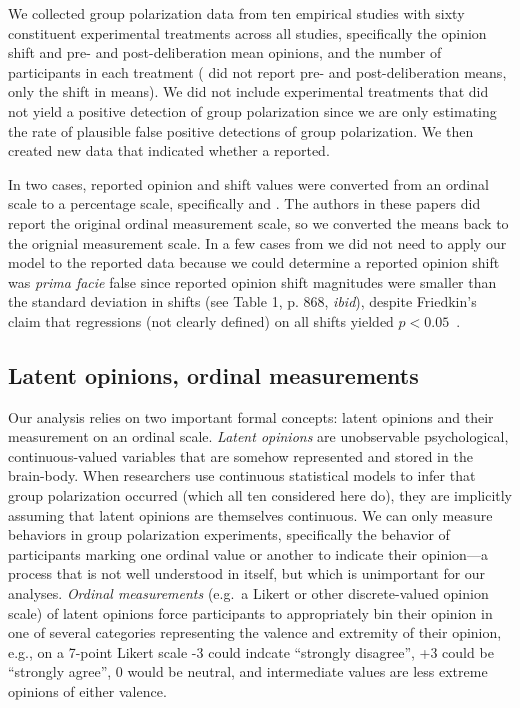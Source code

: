 \documentclass[11pt, letterpaper]{article}
\begin{document}
We collected group polarization data from ten empirical studies with sixty constituent
experimental treatments across all studies, specifically the opinion shift and pre- and
post-deliberation mean opinions, and the number of participants
in each treatment ( did not report pre- and post-deliberation
means, only the shift in means). We did not include experimental treatments that did not 
yield a positive detection of group polarization since we are only estimating
the rate of plausible false positive detections of group polarization. 
We then created new data that indicated whether a reported. 

In two cases, reported opinion and shift values were converted from an ordinal
scale to a percentage scale, specifically  and .
The authors in these papers did report the original ordinal measurement scale,
so we converted the means back to the orignial measurement scale.
In a few cases from  we did not need to apply our 
model to the reported data because we could determine a reported opinion shift was 
\emph{prima facie} false since reported opinion shift magnitudes
were smaller than the standard deviation in shifts (see Table 1, p. 868, \emph{ibid}),
despite Friedkin's claim that regressions (not clearly defined) on all shifts 
yielded $p < 0.05$~\cite{Kruschke2018c}.


\subsection{Latent opinions, ordinal measurements}

Our analysis relies on two important formal concepts: latent opinions and their 
measurement on an ordinal scale. \emph{Latent opinions} are unobservable psychological,
continuous-valued variables that are somehow represented and stored in the
brain-body. 
When researchers use continuous statistical models to infer 
that group polarization occurred (which all ten considered here do), 
they are implicitly assuming that latent opinions are themselves continuous.
We can only measure behaviors in group polarization experiments,
specifically the behavior of participants marking one ordinal value or another
to indicate their opinion---a process that is not well understood in itself,
but which is unimportant for our analyses. \emph{Ordinal measurements} (e.g.\
a Likert or other discrete-valued opinion scale) of latent opinions force
participants to appropriately bin their opinion in one of several categories
representing the valence and extremity of their opinion, e.g., on a
7-point Likert scale -3 could indcate
``strongly disagree'', +3 could be ``strongly agree'', 0 would be neutral, and 
intermediate values are less extreme opinions of either valence.
\end{document}
